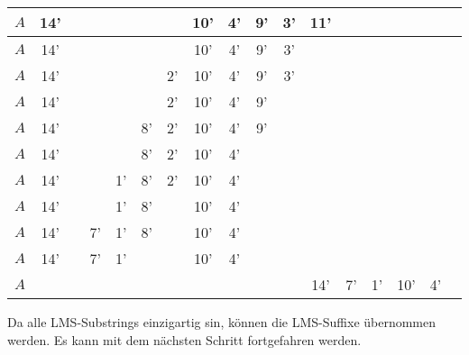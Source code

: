 \begin{center}
{\begin{tabular}{ | l | c | c | c | c | c | c | c | c | c | c | c | c | c | c | c | c | }
            $A$ & 14' & & & & & & 10' & 4' & 9' & 3' & 11' & & & & \\ \hline
            $A$ & 14' & & & & & & 10' & 4' & 9' & 3' & & & & & \\ \hline
            $A$ & 14' & & & & & 2' & 10' & 4' & 9' & 3' & & & & & \\ \hline
            $A$ & 14' & & & & & 2' & 10' & 4' & 9' & & & & & & \\ \hline
            $A$ & 14' & & & & 8' & 2' & 10' & 4' & 9' & & & & & & \\ \hline
            $A$ & 14' & & & & 8' & 2' & 10' & 4' & & & & & & & \\ \hline
            $A$ & 14' & & & 1' & 8' & 2' & 10' & 4' & & & & & & & \\ \hline
            $A$ & 14' & & & 1' & 8' & & 10' & 4' & & & & & & & \\ \hline
            $A$ & 14' & & 7' & 1' & 8' & & 10' & 4' & & & & & & & \\ \hline
            $A$ & 14' & & 7' & 1' & & & 10' & 4' & & & & & &  &  \\ \hline
            $A$  & & & & & & & & & & & 14' & 7' & 1' & 10' & 4' \\ \hline
        \end{tabular}
    }
\end{center}
Da alle LMS-Substrings einzigartig sin, können die LMS-Suffixe übernommen werden. Es kann mit dem nächsten Schritt fortgefahren werden.
